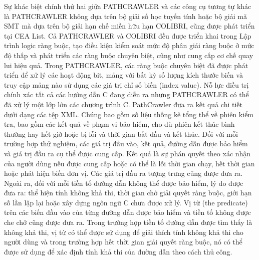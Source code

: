 \documentclass[12pt,a4paper]{article}
\begin{document}
\indent Sự khác biệt chính thứ hai giữa PATHCRAWLER và các công cụ tương tự khác là PATHCRAWLER không dựa trên bộ giải số học tuyến tính hoặc bộ giải mã SMT mà dựa trên bộ giải hạn chế miền hữu hạn COLIBRI, cũng được phát triển tại CEA List. Cả PATHCRAWLER và COLIBRI đều được triển khai trong Lập trình logic ràng buộc, tạo điều kiện kiểm soát mức độ phân giải ràng buộc ở mức độ thấp và phát triển các ràng buộc chuyên biệt, cũng như cung cấp cơ chế quay lui hiệu quả.  Trong PATHCRAWLER, các ràng buộc chuyên biệt đã được phát triển để xử lý các hoạt động bit, mảng với bất kỳ số lượng kích thước biến và truy cập mảng nào sử dụng các giá trị chỉ số biến (index value). Nỗ lực điều trị chính xác tất cả các hướng dẫn C đang diễn ra nhưng PATHCRAWLER có thể đã xử lý một lớp lớn các chương trình C.\newline
\indent PathCrawler đưa ra kết quả chi tiết dưới dạng các tệp XML. Chúng bao gồm số liệu thống kê tổng thể về phiên kiểm tra, bao gồm các kết quả về phạm vi bảo hiểm, cho dù phiên kết thúc bình thường hay hết giờ hoặc bị lỗi và thời gian bắt đầu và kết thúc. Đối với mỗi trường hợp thử nghiệm, các giá trị đầu vào, kết quả, đường dẫn được bảo hiểm và giá trị đầu ra cụ thể được cung cấp. Kết quả là sự phán quyết theo xác nhận của người dùng nếu được cung cấp hoặc có thể là lỗi thời gian chạy, hết thời gian hoặc phát hiện biến đơn vị. Các giá trị đầu ra tượng trưng cũng được đưa ra. Ngoài ra, đối với mỗi tiền tố đường dẫn không thể được bảo hiểm, lý do được đưa ra: thể hiện tính không khả thi, thời gian chờ giải quyết ràng buộc, giới hạn số lần lặp lại hoặc xây dựng ngôn ngữ C chưa được xử lý. Vị từ (the predicate) trên các biến đầu vào của từng đường dẫn được bảo hiểm và tiền tố không được che chở cũng được đưa ra. Trong trường hợp tiền tố đường dẫn được tìm thấy là không khả thi, vị từ có thể được sử dụng để giải thích tính không khả thi cho người dùng và trong trường hợp hết thời gian giải quyết ràng buộc, nó có thể được sử dụng để xác định tính khả thi của đường dẫn theo cách thủ công.
\end{document}
